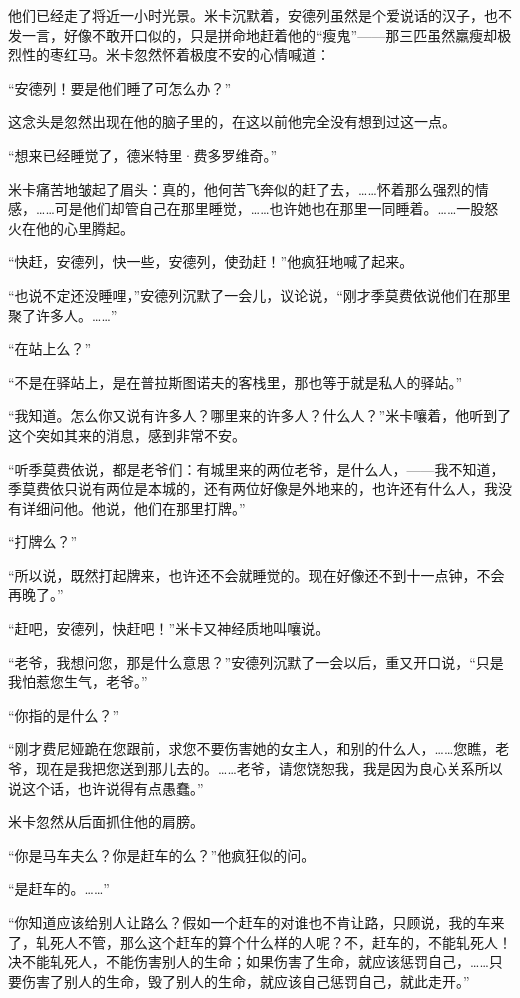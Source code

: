\par 他们已经走了将近一小时光景。米卡沉默着，安德列虽然是个爱说话的汉子，也不发一言，好像不敢开口似的，只是拼命地赶着他的“瘦鬼”——那三匹虽然羸瘦却极烈性的枣红马。米卡忽然怀着极度不安的心情喊道：
\par “安德列！要是他们睡了可怎么办？”
\par 这念头是忽然出现在他的脑子里的，在这以前他完全没有想到过这一点。
\par “想来已经睡觉了，德米特里·费多罗维奇。”
\par 米卡痛苦地皱起了眉头：真的，他何苦飞奔似的赶了去，……怀着那么强烈的情感，……可是他们却管自己在那里睡觉，……也许她也在那里一同睡着。……一股怒火在他的心里腾起。
\par “快赶，安德列，快一些，安德列，使劲赶！”他疯狂地喊了起来。
\par “也说不定还没睡哩，”安德列沉默了一会儿，议论说，“刚才季莫费依说他们在那里聚了许多人。……”
\par “在站上么？”
\par “不是在驿站上，是在普拉斯图诺夫的客栈里，那也等于就是私人的驿站。”
\par “我知道。怎么你又说有许多人？哪里来的许多人？什么人？”米卡嚷着，他听到了这个突如其来的消息，感到非常不安。
\par “听季莫费依说，都是老爷们：有城里来的两位老爷，是什么人，——我不知道，季莫费依只说有两位是本城的，还有两位好像是外地来的，也许还有什么人，我没有详细问他。他说，他们在那里打牌。”
\par “打牌么？”
\par “所以说，既然打起牌来，也许还不会就睡觉的。现在好像还不到十一点钟，不会再晚了。”
\par “赶吧，安德列，快赶吧！”米卡又神经质地叫嚷说。
\par “老爷，我想问您，那是什么意思？”安德列沉默了一会以后，重又开口说，“只是我怕惹您生气，老爷。”
\par “你指的是什么？”
\par “刚才费尼娅跪在您跟前，求您不要伤害她的女主人，和别的什么人，……您瞧，老爷，现在是我把您送到那儿去的。……老爷，请您饶恕我，我是因为良心关系所以说这个话，也许说得有点愚蠢。”
\par 米卡忽然从后面抓住他的肩膀。
\par “你是马车夫么？你是赶车的么？”他疯狂似的问。
\par “是赶车的。……”
\par “你知道应该给别人让路么？假如一个赶车的对谁也不肯让路，只顾说，我的车来了，轧死人不管，那么这个赶车的算个什么样的人呢？不，赶车的，不能轧死人！决不能轧死人，不能伤害别人的生命；如果伤害了生命，就应该惩罚自己，……只要伤害了别人的生命，毁了别人的生命，就应该自己惩罚自己，就此走开。”
